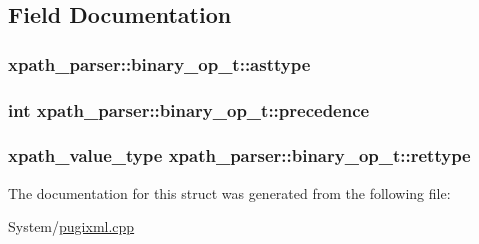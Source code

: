 \subsection{Field Documentation}
\hypertarget{structxpath__parser_1_1binary__op__t_a1af7e302de46bf45ffdb466cfd89fa15}{
\subsubsection[{asttype}]{ xpath\-\_\-parser\-::binary\-\_\-op\-\_\-t\-::asttype}}\label{structxpath__parser_1_1binary__op__t_a1af7e302de46bf45ffdb466cfd89fa15}
\hypertarget{structxpath__parser_1_1binary__op__t_a422064e11cc65c6110c422568441b69c}{
\subsubsection[{precedence}]{\setlength{\rightskip}{0pt plus 5cm}int xpath\-\_\-parser\-::binary\-\_\-op\-\_\-t\-::precedence}}\label{structxpath__parser_1_1binary__op__t_a422064e11cc65c6110c422568441b69c}
\hypertarget{structxpath__parser_1_1binary__op__t_a02c18d8d6d9a7ef28b2fefcb900e75bc}{
\subsubsection[{rettype}]{\setlength{\rightskip}{0pt plus 5cm}xpath\-\_\-value\-\_\-type xpath\-\_\-parser\-::binary\-\_\-op\-\_\-t\-::rettype}}\label{structxpath__parser_1_1binary__op__t_a02c18d8d6d9a7ef28b2fefcb900e75bc}


The documentation for this struct was generated from the following file\-:\begin{DoxyCompactItemize}
\item 
System/\hyperlink{pugixml_8cpp}{pugixml.\-cpp}\end{DoxyCompactItemize}
